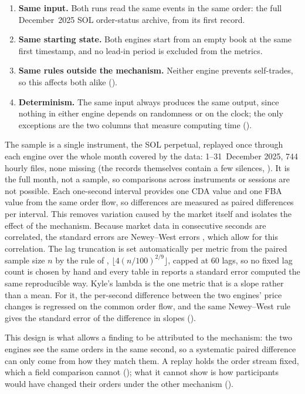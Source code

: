 \begin{enumerate}
  \item \textbf{Same input.} Both runs read the same events in the same order:
  the full December~2025 SOL order-status archive, from its first record.
  \item \textbf{Same starting state.} Both engines start from an empty book at
  the same first timestamp, and no lead-in period is excluded from the
  metrics.
  \item \textbf{Same rules outside the mechanism.} Neither engine prevents
  self-trades, so this affects both alike ().
  \item \textbf{Determinism.} The same input always produces the same output,
  since nothing in either engine depends on randomness or on the clock; the
  only exceptions are the two columns that measure computing time
  ().
\end{enumerate}

The sample is a single instrument, the SOL perpetual, replayed once through each engine
over the whole month covered by the data: 1--31~December 2025, 744 hourly
files, none missing (the records themselves contain a few silences,
). It is the full month, not a sample, so comparisons across
instruments or sessions are not possible. Each one-second interval provides one
CDA value and one FBA value from the same order flow, so differences are
measured as paired differences per interval. This removes variation caused by
the market itself and isolates the effect of the mechanism. Because market
data in consecutive seconds are correlated, the standard errors are
Newey--West errors \citep{newey1987simple}, which allow for this
correlation. The lag truncation is set automatically per metric from the
paired sample size $n$ by the rule of \citet{newey1994automatic},
$\lfloor 4(n/100)^{2/9} \rfloor$, capped at 60 lags, so no fixed lag
count is chosen by hand and every table in  reports a
standard error computed the same reproducible way. Kyle's lambda is the
one metric that is a slope rather than a mean. For it, the per-second
difference between the two engines' price changes is regressed on the
common order flow, and the same Newey--West rule gives the standard error
of the difference in slopes ().

This design is what allows a finding to be attributed to the mechanism:
the two engines see the same orders in the same second, so a systematic
paired difference can only come from how they match them. A replay holds
the order stream fixed, which a field comparison cannot ();
what it cannot show is how participants would have changed their orders
under the other mechanism ().

